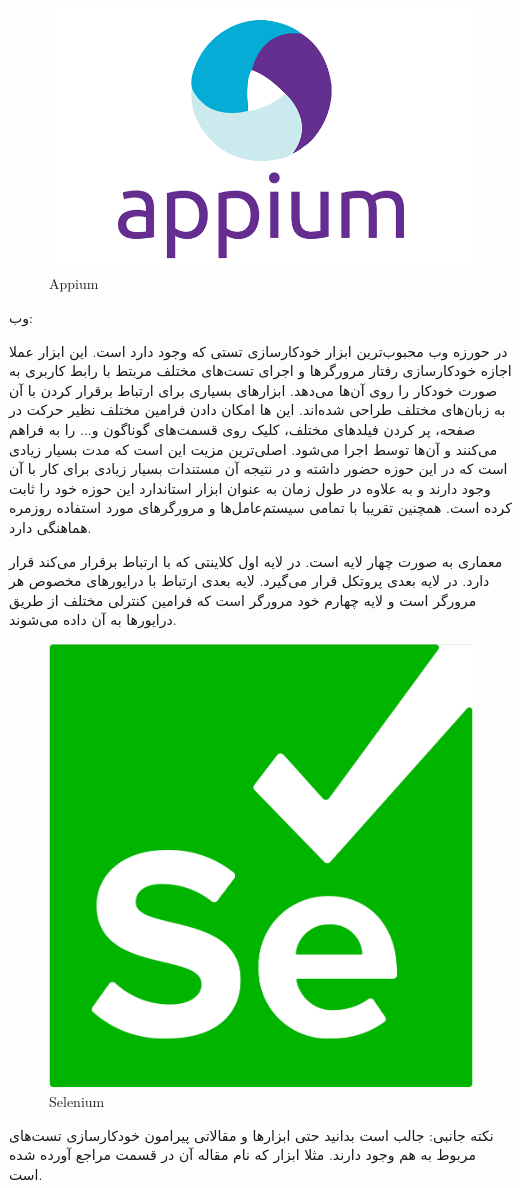 {  \begin{figure}[H]
 	\centering
 	\includegraphics[width=0.3\linewidth]{figs/appium.png}
 	\caption{Appium}
 	\label{fig:appium}
 \end{figure}
 
 وب:
 
 در حورزه وب محبوب‌ترین ابزار خودکارسازی تستی که وجود دارد  است. این ابزار عملا اجازه خودکارسازی رفتار مرورگر‌ها و اجرای تست‌های مختلف مربتط با رابط کاربری به صورت خودکار را روی آن‌ها می‌دهد. ابزارهای بسیاری برای ارتباط برقرار کردن با آن به زبان‌های مختلف طراحی شده‌اند. این  ها امکان دادن فرامین مختلف نظیر حرکت در صفحه، پر کردن فیلد‌های مختلف، کلیک روی قسمت‌های گوناگون و... را به  فراهم می‌کنند و آن‌ها توسط  اجرا می‌شود. اصلی‌ترین مزیت  این است که مدت بسیار زیادی است که در این حوزه حضور داشته و در نتیجه آن مستندات بسیار زیادی برای کار با آن وجود دارند و به علاوه در طول زمان به عنوان ابزار استاندارد این حوزه خود را ثابت کرده است. همچنین  تقریبا با تمامی سیستم‌عامل‌ها و مرورگرهای مورد استفاده روزمره هماهنگی دارد.
 
  معماری  به صورت چهار لایه است. در لایه اول کلاینتی که با  ارتباط برقرار می‌کند قرار دارد. در لایه بعدی پروتکل  قرار می‌گیرد. لایه بعدی ارتباط با درایورهای مخصوص هر مرورگر است و لایه چهارم خود مرورگر است که فرامین کنترلی مختلف از طریق درایور‌ها به آن داده می‌شوند.
  
   \begin{figure}[H]
  	\centering
  	\includegraphics[width=0.3\linewidth]{figs/selenium.png}
  	\caption{Selenium}
  	\label{fig:selenium}
  \end{figure}
 
 
 نکته جانبی:
 جالب است بدانید حتی ابزارها و مقالاتی پیرامون خودکارسازی تست‌های مربوط به  هم وجود دارند. مثلا ابزار  که نام مقاله آن در قسمت مراجع آورده شده است.
 
}
